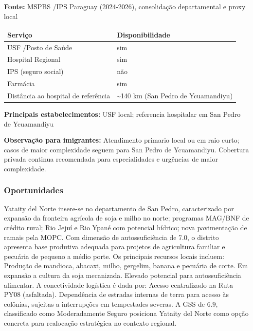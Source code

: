 \textbf{Fonte:} MSPBS /\allowbreak  IPS Paraguay (2024-2026), consolidação
departamental e proxy local

{\def\LTcaptype{none} %
\begin{longtable}[]{@{}
  >{\raggedright\arraybackslash}p{}
  >{\raggedright\arraybackslash}p{}@{}}
\toprule\noalign{}
\begin{minipage}[b]{\linewidth}\raggedright
Serviço
\end{minipage} & \begin{minipage}[b]{\linewidth}\raggedright
Disponibilidade
\end{minipage} \\
\midrule\noalign{}
\endhead
\bottomrule\noalign{}
\endlastfoot
USF /\allowbreak  Posto de Saúde & sim \\
Hospital Regional & sim \\
IPS (seguro social) & não \\
Farmácia & sim \\
Distância ao hospital de referência & \textasciitilde140 km (San Pedro
de Ycuamandiyu) \\
\end{longtable}
}

\textbf{Principais estabelecimentos:} USF local; referencia hospitalar
em San Pedro de Ycuamandiyu

\textbf{Observação para imigrantes:} Atendimento primario local ou em
raio curto; casos de maior complexidade seguem para San Pedro de
Ycuamandiyu. Cobertura privada continua recomendada para especialidades
e urgências de maior complexidade.
\newpage

\subsubsection*{Oportunidades}\label{oport-yataity-del-norte-0215}
Yataity del Norte insere-se no departamento de San Pedro, caracterizado por expansão da fronteira agrícola de soja e milho no norte; programas MAG/BNF de crédito rural; Rio Jejuí e Rio Ypané com potencial hídrico; nova pavimentação de ramais pela MOPC. Com dimensão de autossuficiência de 7.0, o distrito apresenta base produtiva adequada para projetos de agricultura familiar e pecuária de pequeno a médio porte. Os principais recursos locais incluem: Produção de mandioca, abacaxi, milho, gergelim, banana e pecuária de corte. Em expansão a cultura da soja mecanizada. Elevado potencial para autossuficiência alimentar. A conectividade logística é dada por: Acesso centralizado na Ruta PY08 (asfaltada). Dependência de estradas internas de terra para acesso às colônias, sujeitas a interrupções em tempestades severas. A GSS de 6.9, classificado como Moderadamente Seguro posiciona Yataity del Norte como opção concreta para realocação estratégica no contexto regional.

